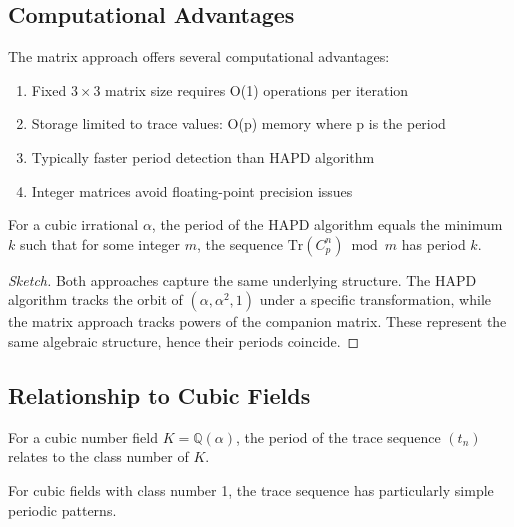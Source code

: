 \subsection{Computational Advantages}

\begin{proposition}[Efficiency]
The matrix approach offers several computational advantages:
\begin{enumerate}
    \item Fixed $3 \times 3$ matrix size requires O(1) operations per iteration
    \item Storage limited to trace values: O(p) memory where p is the period
    \item Typically faster period detection than HAPD algorithm
    \item Integer matrices avoid floating-point precision issues
\end{enumerate}
\end{proposition}

\begin{theorem}
For a cubic irrational $\alpha$, the period of the HAPD algorithm equals the minimum $k$ such that for some integer $m$, the sequence $\text{Tr}(C_p^n) \bmod m$ has period $k$.
\end{theorem}

\begin{proof}[Sketch]
Both approaches capture the same underlying structure. The HAPD algorithm tracks the orbit of $(\alpha, \alpha^2, 1)$ under a specific transformation, while the matrix approach tracks powers of the companion matrix. These represent the same algebraic structure, hence their periods coincide.
\end{proof}

\subsection{Relationship to Cubic Fields}

\begin{theorem}
For a cubic number field $K = \mathbb{Q}(\alpha)$, the period of the trace sequence $(t_n)$ relates to the class number of $K$.
\end{theorem}

\begin{corollary}
For cubic fields with class number 1, the trace sequence has particularly simple periodic patterns.
\end{corollary}

